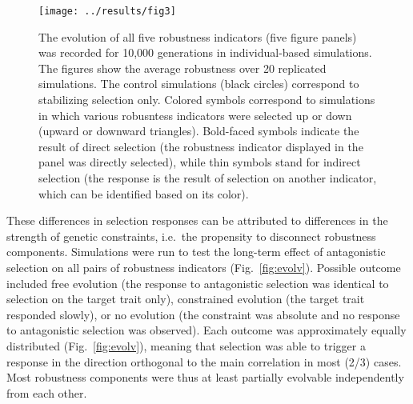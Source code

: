 \documentclass[10pt,a4paper]{article}
\begin{document}
\begin{figure}[t]
\begin{adjustwidth}{-1in}{0in}
\begin{flushright}
\texttt{[image: ../results/fig3]}
\caption{\color{Gray} \label{fig:evol} The evolution of all five robustness indicators (five figure panels) was recorded for 10,000 generations in individual-based simulations. The figures show the average robustness over 20 replicated simulations. The control simulations (black circles) correspond to stabilizing selection only. Colored symbols correspond to simulations in which various robusntess indicators were selected up or down (upward or downward triangles). Bold-faced symbols indicate the result of direct selection (the robustness indicator displayed in the panel was directly selected), while thin symbols stand for indirect selection (the response is the result of selection on another indicator, which can be identified based on its color). }
\end{flushright}\end{adjustwidth}
\end{figure}

These differences in selection responses can be attributed to differences in the strength of genetic constraints, i.e.\ the propensity to disconnect robustness components. Simulations were run to test the long-term effect of antagonistic selection on all pairs of robustness indicators (Fig.~\ref{fig:evolv}). Possible outcome included free evolution (the response to antagonistic selection was identical to selection on the target trait only), constrained evolution (the target trait responded slowly), or no evolution (the constraint was absolute and no response to antagonistic selection was observed). Each outcome was approximately equally distributed (Fig.~\ref{fig:evolv}), meaning that selection was able to trigger a response in the direction orthogonal to the main correlation in most (2/3) cases. Most robustness components were thus at least partially evolvable independently from each other. 
\end{document}
